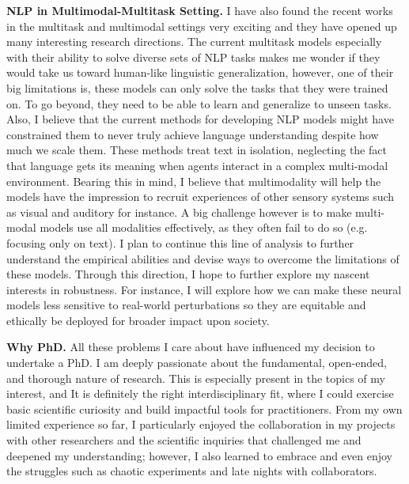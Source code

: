 \documentclass[a4paper]{article}
\begin{document}
\noindent \textbf{NLP in Multimodal-Multitask Setting.} I have also found the recent works in the multitask \cite{MQAN, T_five, T_zero} and multimodal \cite{DALLE, CLIP} settings very exciting and they have opened up many interesting research directions. The current multitask models especially with their ability to solve diverse sets of NLP tasks makes me wonder if they would take us toward human-like linguistic generalization, however, one of their big limitations is, these models can only solve the tasks that they were trained on. To go beyond, they need to be able to learn and generalize to unseen tasks. Also, I believe that the current methods for developing NLP models might have constrained them to never truly achieve language understanding despite how much we scale them. These methods treat text in isolation, neglecting the fact that language gets its meaning when agents interact in a complex multi-modal environment. Bearing this in mind, I believe that multimodality will help the models have the impression to recruit experiences of other sensory systems such as visual and auditory for instance. A big challenge however is to make multi-modal models use all modalities effectively, as they often fail to do so (e.g. focusing only on text). I plan to continue this line of analysis to further understand the empirical abilities and devise ways to overcome the limitations of these models. Through this direction, I hope to further explore my nascent interests in robustness. For instance, I will explore how we can make these neural models less sensitive to real-world perturbations so they are equitable and ethically be deployed for broader impact upon society.

\vspace{.2 in}
\noindent \textbf{Why PhD.} All these problems I care about have influenced my decision to undertake a PhD. I am deeply passionate about the fundamental, open-ended, and thorough nature of research. This is especially present in the topics of my interest, and It is definitely the right interdisciplinary fit, where I could exercise basic scientific curiosity and build impactful tools for practitioners. From my own limited experience so far, I particularly enjoyed the collaboration in my projects with other researchers and the scientific inquiries that challenged me and deepened my understanding; however, I also learned to embrace and even enjoy the struggles such as chaotic experiments and late nights with collaborators.
\end{document}
